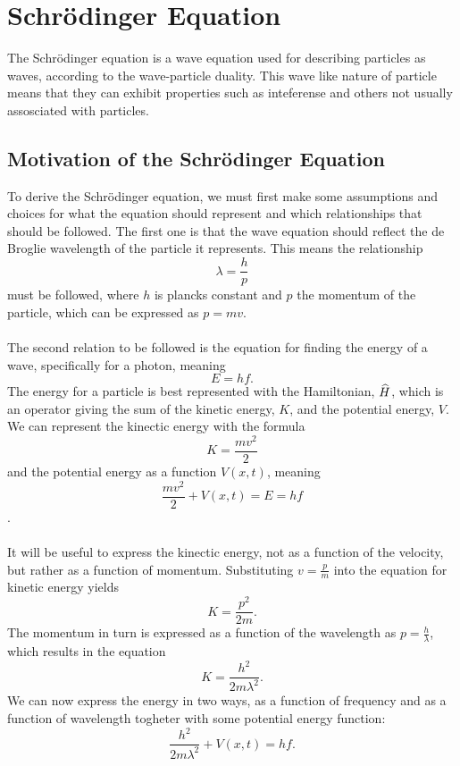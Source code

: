 \section{Schrödinger Equation} \label{appendix:schrödinger}
    
    The Schrödinger equation is a wave equation used for describing particles as waves, according to the wave-particle duality. This wave like nature of particle means that they can exhibit properties such as inteferense and others not usually assosciated with particles.
    
    \subsection{Motivation of the Schrödinger Equation}
    To derive the Schrödinger equation, we must first make some assumptions and choices for what the equation should represent and which relationships that should be followed. The first one is that the wave equation should reflect the de Broglie wavelength of the particle it represents. This means the relationship \begin{equation}
        \lambda=\frac{h}{p} \label{eq:de-broglie-wavelength}
    \end{equation} must be followed, where $h$ is plancks constant and $p$ the momentum of the particle, which can be expressed as $p=mv$. \\ \\
    The second relation to be followed is the equation for finding the energy of a wave, specifically for a photon, meaning \begin{equation}
        E=hf.\label{eq:photon-energy}
    \end{equation}
    The energy for a particle is best represented with the Hamiltonian, $\widehat{H}$, which is an operator giving the sum of the kinetic energy, $K$, and the potential energy, $V$. We can represent the kinectic energy with the formula $$K=\frac{mv^2}{2}$$ and the potential energy as a function $V(x,t)$, meaning \begin{equation}
        \frac{mv^2}{2}+V(x,t)=E=hf
    \end{equation}.
    \\ \\
    It will be useful to express the kinectic energy, not as  a function of the velocity, but rather as a function of momentum. Substituting $v=\frac{p}{m}$ into the equation for kinetic energy yields \begin{equation}
        K=\frac{p^2}{2m}.
    \end{equation} The momentum in turn is expressed as a function of the wavelength as $p=\frac{h}{\lambda}$, which results in the equation \begin{equation}
        K=\frac{h^2}{2m\lambda^2}.
    \end{equation} We can now express the energy in two ways, as a function of frequency and as a function of wavelength togheter with some potential energy function: \begin{equation}
        \frac{h^2}{2m\lambda^2}+V(x,t)=hf.
    \end{equation}
